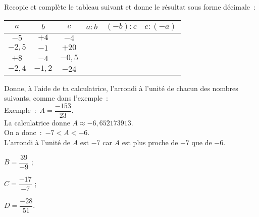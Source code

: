 \begin{exercice}
Recopie et complète le tableau suivant et donne le résultat sous forme décimale :
{\small
\begin{center}
\begin{tabular}{|c|c|c|c|c|c|}
\hline
\cellcolor{H2} $a$ & \cellcolor{H2} $b$ & \cellcolor{H2} $c$ & \cellcolor{A2} $a : b$ & \cellcolor{A2} $(-b) : c$ & \cellcolor{A2} $c : (-a)$ \\\hline 
\cellcolor{H3} $-5$ & \cellcolor{H3} $+4$ & \cellcolor{H3} $-4$ & \cellcolor{A3} & \cellcolor{A3} & \cellcolor{A3} \\\hline
\cellcolor{H3} $-2,5$ & \cellcolor{H3} $-1$ & \cellcolor{H3} $+20$ & \cellcolor{A3} & \cellcolor{A3} & \cellcolor{A3} \\\hline
\cellcolor{H3} $+8$ & \cellcolor{H3} $-4$ & \cellcolor{H3} $-0,5$ & \cellcolor{A3} & \cellcolor{A3} & \cellcolor{A3} \\\hline
\cellcolor{H3} $-2,4$ & \cellcolor{H3} $-1,2$ & \cellcolor{H3} $-24$ & \cellcolor{A3} & \cellcolor{A3} & \cellcolor{A3} \\\hline
 \end{tabular}
 \end{center}
 } %
\end{exercice}


\begin{exercice}
Donne, à l'aide de ta calculatrice, l'arrondi à l'unité de chacun des nombres suivants, comme dans l'exemple : \\[0.5em]
Exemple : $A = \dfrac{-153}{23}$. \\[0.5em]
La calculatrice donne $A \approx -6,652173913$. \\[0.5em]
On a donc : $-7 < A < -6$. \\[0.5em]
L'arrondi à l'unité de $A$ est $-7$ car $A$ est plus proche de $-7$ que de $-6$.
\begin{colitemize}{3}
 \item $B = \dfrac{39}{-9}$ ;
 \item $C = \dfrac{-17}{-7}$ ;
 \item $D = \dfrac{-28}{51}$.
 \end{colitemize}
\end{exercice}



